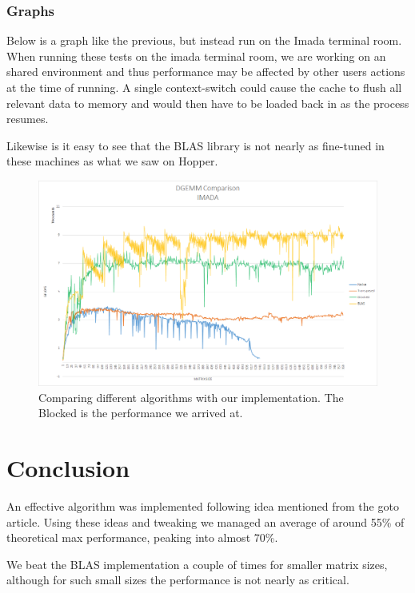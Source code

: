 \documentclass[a4paper,11pt,oneside]{book}
\begin{document}
\subsection{Graphs}

Below is a graph like the previous, but instead run on the Imada terminal room. When running these tests on the imada terminal room, we are working on an shared environment and thus performance may be affected by other users actions at the time of running. A single context-switch could cause the cache to flush all relevant data to memory and would then have to be loaded back in as the process resumes.

Likewise is it easy to see that the BLAS library is not nearly as fine-tuned in these machines as what we saw on Hopper.

\begin{figure}[H]
  \centering
  \includegraphics[width=0.9\linewidth]{comparison-graph-imada.png}
  \caption{Comparing different algorithms with our implementation. The Blocked is the performance we arrived at.}
  \centering
  \label{fig:sub1}
\end{figure}


\chapter{Conclusion}
An effective algorithm was implemented following idea mentioned from the goto article. Using these ideas and tweaking we managed an average of around 55\% of theoretical max performance, peaking into almost 70\%. 

We beat the BLAS implementation a couple of times for smaller matrix sizes, although for such small sizes the performance is not nearly as critical.


\end{document}
